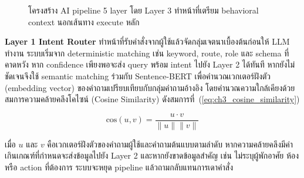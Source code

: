 \begin{figure}[!htbp]
    \centering
    \caption{โครงสร้าง AI pipeline 5 layer โดย Layer 3 ทำหน้าที่เตรียม behavioral context นอกเส้นทาง execute หลัก}
    \label{fig:ch3-ai-flow}
\end{figure}
\FloatBarrier

\textbf{Layer 1 Intent Router} ทำหน้าที่รับคำสั่งจากผู้ใช้แล้วจัดกลุ่มเจตนาเบื้องต้นก่อนให้ LLM ทำงาน ระบบเริ่มจาก deterministic matching เช่น keyword, route, role และ schema ที่คาดหวัง หาก confidence เพียงพอจะส่ง query พร้อม intent ไปยัง Layer 2 ได้ทันที หากยังไม่ชัดเจนจึงใช้ semantic matching ร่วมกับ Sentence-BERT เพื่อคำนวณเวกเตอร์ฝังตัว (embedding vector) ของคำถามเปรียบเทียบกับกลุ่มคำถามอ้างอิง โดยคำนวณความใกล้เคียงด้วยสมการความคล้ายคลึงโคไซน์ (Cosine Similarity) ดังสมการที่~(\ref{eq:ch3_cosine_similarity})

\begin{equation}
\text{cos}(u, v) = \frac{u \cdot v}{\|u\| \|v\|}
\label{eq:ch3_cosine_similarity}
\end{equation}

เมื่อ $u$ และ $v$ คือเวกเตอร์ฝังตัวของคำถามผู้ใช้และคำถามต้นแบบตามลำดับ หากความคล้ายคลึงมีค่าเกินเกณฑ์ที่กำหนดจะส่งข้อมูลไปยัง Layer 2 และหากยังขาดข้อมูลสำคัญ เช่น ไม่ระบุผู้พักอาศัย ห้อง หรือ action ที่ต้องการ ระบบจะหยุด pipeline แล้วถามกลับแทนการเดาคำสั่ง

